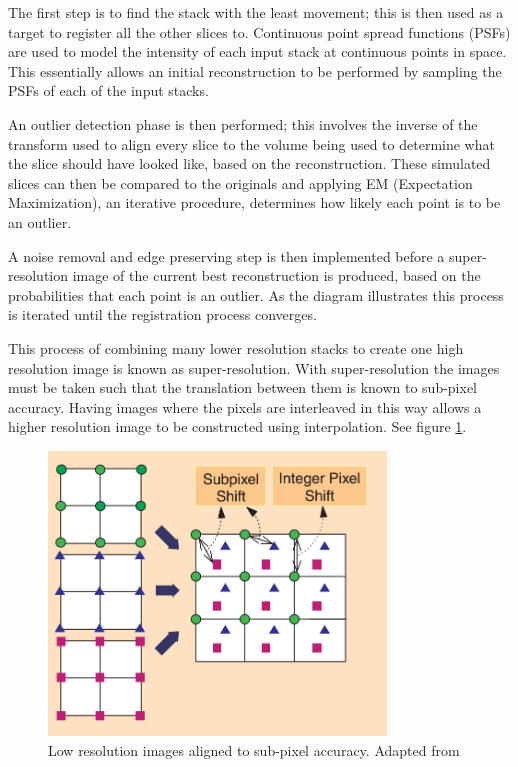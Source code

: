 The first step is to find the stack with the least movement; this is then used as a target to register all the other slices to. Continuous point spread functions (PSFs) are used to model the intensity of each input stack at continuous points in space. This essentially allows an initial reconstruction to be performed by sampling the PSFs of each of the input stacks.

An outlier detection phase is then performed; this involves the inverse of the transform used to align every slice to the volume being used to determine what the slice should have looked like, based on the reconstruction. These simulated slices can then be compared to the originals and applying EM (Expectation Maximization), an iterative procedure, determines how likely each point is to be an outlier.

A noise removal and edge preserving step is then implemented before a super-resolution image of the current best reconstruction is produced, based on the probabilities that each point is an outlier. As the diagram illustrates this process is iterated until the registration process converges.

This process of combining many lower resolution stacks to create one high resolution image is known as super-resolution. With super-resolution the images must be taken such that the translation between them is known to sub-pixel accuracy. Having images where the pixels are interleaved in this way allows a higher resolution image to be constructed using interpolation. See figure \ref{fig:superresolution}.

\begin{figure}[H]
    \centering
	\includegraphics[width=0.8\textwidth]{images/background/super_resolution.png}
    \caption{Low resolution images aligned to sub-pixel accuracy. Adapted from \cite{superresolution2}}
    \label{fig:superresolution}
\end{figure}

